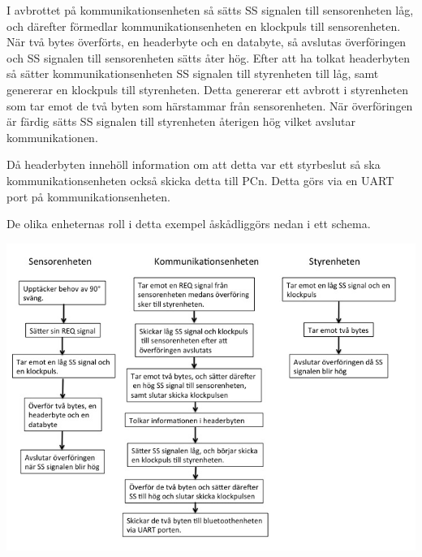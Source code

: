 I avbrottet på kommunikationsenheten så sätts SS signalen till sensorenheten låg, och därefter förmedlar kommunikationsenheten en klockpuls till sensorenheten. När två bytes överförts, en headerbyte och en databyte, så avslutas överföringen och SS signalen till sensorenheten sätts åter hög. Efter att ha tolkat headerbyten så sätter kommunikationsenheten SS signalen till styrenheten till låg, samt genererar en klockpuls till styrenheten. Detta genererar ett avbrott i styrenheten som tar emot de två byten som härstammar från sensorenheten. När överföringen är färdig sätts SS signalen till styrenheten återigen hög vilket avslutar kommunikationen. 

Då headerbyten innehöll information om att detta var ett styrbeslut så ska kommunikationsenheten också skicka detta till PCn. Detta görs via en UART port på kommunikationsenheten.

De olika enheternas roll i detta exempel åskådliggörs nedan i ett schema.

\includegraphics[angle=0,scale=0.5]{bilder/Schema_exempel.png}





